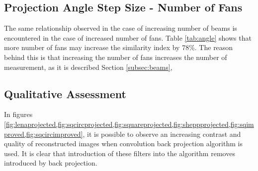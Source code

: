 \documentclass[journal]{IEEEtran}
\begin{document}
\subsection{Projection Angle Step Size - Number of Fans}
The same relationship observed in the case of increasing number of beams is encountered in the case of increased number of fans. Table \ref{tab:angle} shows that more number of fans may increase the similarity index by 78\%. The reason behind this is that increasing the number of fans increases the number of measurement, as it is described Section \ref{subsec:beams}, 

\subsection{Qualitative Assessment}
In figures \cref{fig:lenaprojected,fig:sqcircprojected,fig:squareprojected,fig:sheppprojected,fig:sqimproved,fig:sqcircimproved}, it is possible to observe an increasing contrast and quality of reconstructed images when convolution back projection algorithm is used. It is clear that introduction of these filters into the algorithm removes introduced by back projection. 
\newpage
\printbibliography
\end{document}
